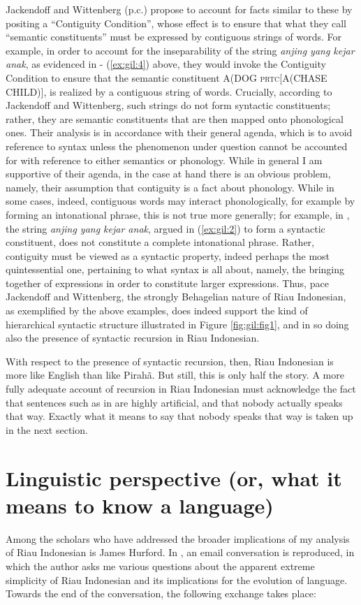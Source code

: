 \documentclass[output=paper,colorlinks,citecolor=brown
]{langscibook}
\begin{document}
Jackendoff and Wittenberg (p.c.) propose to account for facts similar to these by positing a ``Contiguity Condition'', whose effect is to ensure that what they call ``semantic constituents'' must be expressed by contiguous strings of words.  For example, in order to account for the inseparability of the string \emph{anjing yang kejar anak}, as evidenced in  - (\ref{ex:gil:4}) above, they would invoke the Contiguity Condition to ensure that the semantic constituent A(DOG \textsc{prtc}[A(CHASE CHILD)], is realized by a contiguous string of words.  Crucially, according to Jackendoff and Wittenberg, such strings do not form syntactic constituents; rather, they are semantic constituents that are then mapped onto phonological ones.  Their analysis is in accordance with their general agenda, which is to avoid reference to syntax unless the phenomenon under question cannot be accounted for with reference to either semantics or phonology.  While in general I am supportive of their agenda, in the case at hand there is an obvious problem, namely, their assumption that contiguity is a fact about phonology.  While in some cases, indeed, contiguous words may interact phonologically, for example by forming an intonational phrase, this is not true more generally; for example, in , the string \emph{anjing yang kejar anak}, argued in (\ref{ex:gil:2}) to form a syntactic constituent, does not constitute a complete intonational phrase.  Rather, contiguity must be viewed as a syntactic property, indeed perhaps the most quintessential one, pertaining to what syntax is all about, namely, the bringing together of expressions in order to constitute larger expressions.  Thus, pace Jackendoff and Wittenberg, the strongly Behagelian nature of Riau Indonesian, as exemplified by the above examples, does indeed support the kind of hierarchical syntactic structure illustrated in Figure \ref{fig:gil:fig1}, and in so doing also the presence of syntactic recursion in Riau Indonesian.

With respect to the presence of syntactic recursion, then, Riau Indonesian is more like English than like Pirahã.  But still, this is only half the story.  A more fully adequate account of recursion in Riau Indonesian must acknowledge the fact that sentences such as in  are highly artificial, and that nobody actually speaks that way.  Exactly what it means to say that nobody speaks that way is taken up in the next section.

\section{Linguistic perspective (or, what it means to know a language)}
Among the scholars who have addressed the broader implications of my analysis of Riau Indonesian is James Hurford. In \citet[410—413]{hurford2011origins}, an email conversation is reproduced, in which the author asks me various questions about the apparent extreme simplicity of Riau Indonesian and its implications for the evolution of language.  Towards the end of the conversation, the following exchange takes place:
\end{document}
